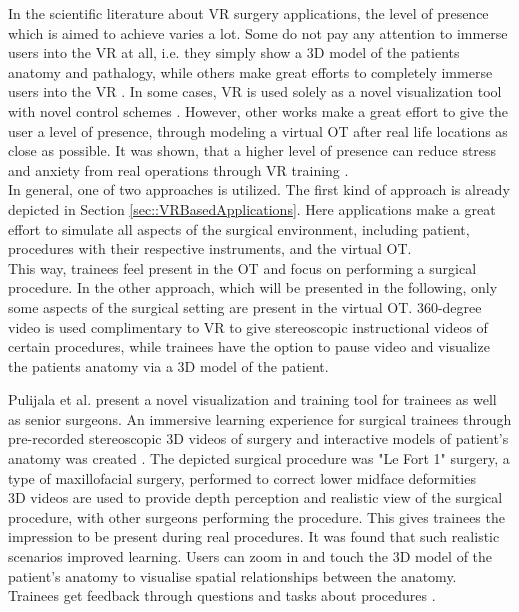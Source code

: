 In the scientific literature about VR surgery applications, the level of presence which is aimed to achieve varies a lot.
Some do not pay any attention to immerse users into the VR at all, i.e. they simply show a 3D model of the patients anatomy and 
pathalogy, while others make great efforts to completely immerse users into the VR \cite{Vaughan.2016}.
In some cases, VR is used solely as a novel visualization tool with novel control schemes \cite{.2017}.
However, other works make a great effort to give the user a level of presence, through modeling a virtual OT after real life locations as close as possible.
It was shown, that a higher level of presence can reduce stress and anxiety from real operations through VR training \cite{Pulijala.2017,Pulijala.2018,Pulijala.2018b}.
\\ In general, one of two approaches is utilized.
The first kind of approach is already depicted in Section \ref{sec::VRBasedApplications}.
Here applications make a great effort to simulate all aspects of the surgical environment, including patient, procedures with their respective instruments, and the virtual OT.
\\ This way, trainees feel present in the OT and focus on performing a surgical procedure.
In the other approach, which will be presented in the following, only some aspects of the surgical setting are present in the virtual OT.
360-degree video is used complimentary to VR to give stereoscopic instructional videos of certain procedures, while trainees have the option to pause video 
and visualize the patients anatomy via a 3D model of the patient.

Pulijala et al. \cite{Pulijala.2017} present a novel visualization and training tool for trainees as well as senior surgeons.
An immersive learning experience for surgical trainees through pre-recorded stereoscopic 3D videos of surgery and interactive models of patient’s anatomy was created \cite{Pulijala.2017}.
The depicted surgical procedure was "Le Fort 1" surgery, a type of maxillofacial surgery, performed to correct lower midface deformities \cite{Pulijala.2017}
\\ 3D videos are used to provide depth perception and realistic view of the surgical procedure, with other surgeons performing the procedure.
This gives trainees the impression to be present during real procedures.
It was found that such realistic scenarios improved learning.
Users can zoom in and touch the 3D model of the patient's anatomy to visualise spatial relationships between the anatomy.
Trainees get feedback through questions and tasks about procedures \cite{Pulijala.2017,Pulijala.2018}.

